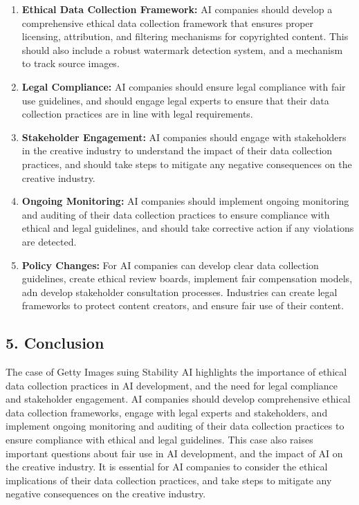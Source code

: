 \documentclass{article}
\theoremstyle{mytheoremstyle}
\theoremstyle{mytheoremstyle}
\theoremstyle{myproblemstyle}
\begin{document}
\begin{enumerate}
    \item \textbf{Ethical Data Collection Framework:} AI companies should develop a comprehensive ethical data collection framework that ensures proper licensing, attribution, and filtering mechanisms for copyrighted content. This should also include a robust watermark detection system, and a mechanism to track source images.
    \item \textbf{Legal Compliance:} AI companies should ensure legal compliance with fair use guidelines, and should engage legal experts to ensure that their data collection practices are in line with legal requirements.
    \item \textbf{Stakeholder Engagement:} AI companies should engage with stakeholders in the creative industry to understand the impact of their data collection practices, and should take steps to mitigate any negative consequences on the creative industry.
    \item \textbf{Ongoing Monitoring:} AI companies should implement ongoing monitoring and auditing of their data collection practices to ensure compliance with ethical and legal guidelines, and should take corrective action if any violations are detected.
    \item \textbf{Policy Changes:} For AI companies can develop clear data collection guidelines, create ethical review boards, implement fair compensation models, adn develop stakeholder consultation processes. Industries can create legal frameworks to protect content creators, and ensure fair use of their content.
\end{enumerate}

\subsection*{5. Conclusion}

The case of Getty Images suing Stability AI highlights the importance of ethical data collection practices in AI development, and the need for legal compliance and stakeholder engagement. AI companies should develop comprehensive ethical data collection frameworks, engage with legal experts and stakeholders, and implement ongoing monitoring and auditing of their data collection practices to ensure compliance with ethical and legal guidelines. This case also raises important questions about fair use in AI development, and the impact of AI on the creative industry. It is essential for AI companies to consider the ethical implications of their data collection practices, and take steps to mitigate any negative consequences on the creative industry.
\end{document}
